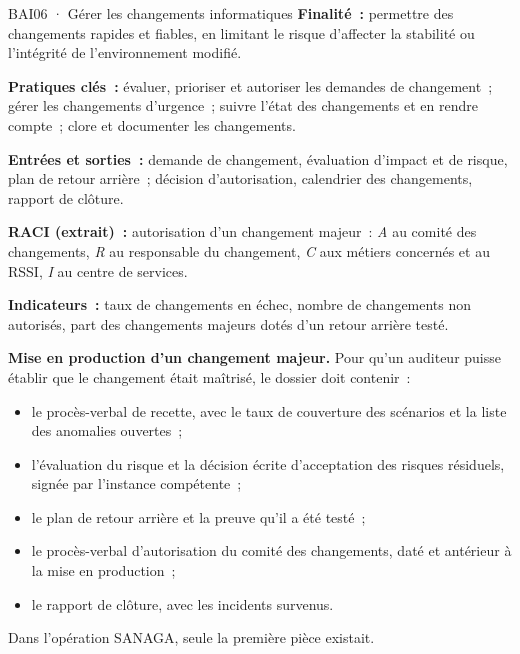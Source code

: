 \begin{boxobjet}{BAI06 · Gérer les changements informatiques}
\textbf{Finalité~:} permettre des changements rapides et fiables, en
limitant le risque d'affecter la stabilité ou l'intégrité de
l'environnement modifié.

\textbf{Pratiques clés~:} évaluer, prioriser et autoriser les demandes de
changement~; gérer les changements d'urgence~; suivre l'état des
changements et en rendre compte~; clore et documenter les changements.

\textbf{Entrées et sorties~:} demande de changement, évaluation d'impact et
de risque, plan de retour arrière~; décision d'autorisation, calendrier des
changements, rapport de clôture.

\textbf{RACI (extrait)~:} autorisation d'un changement majeur~:
\emph{A} au comité des changements, \emph{R} au responsable du changement,
\emph{C} aux métiers concernés et au RSSI, \emph{I} au centre de services.

\textbf{Indicateurs~:} taux de changements en échec, nombre de changements
non autorisés, part des changements majeurs dotés d'un retour arrière
testé.
\end{boxobjet}

\begin{boxprocedure}
\textbf{Mise en production d'un changement majeur.} Pour qu'un auditeur
puisse établir que le changement était maîtrisé, le dossier doit contenir~:
\begin{itemize}
    \item le procès-verbal de recette, avec le taux de couverture des
          scénarios et la liste des anomalies ouvertes~;
    \item l'évaluation du risque et la décision écrite d'acceptation des
          risques résiduels, signée par l'instance compétente~;
    \item le plan de retour arrière et la preuve qu'il a été testé~;
    \item le procès-verbal d'autorisation du comité des changements, daté
          et antérieur à la mise en production~;
    \item le rapport de clôture, avec les incidents survenus.
\end{itemize}
Dans l'opération SANAGA, seule la première pièce existait.
\end{boxprocedure}

